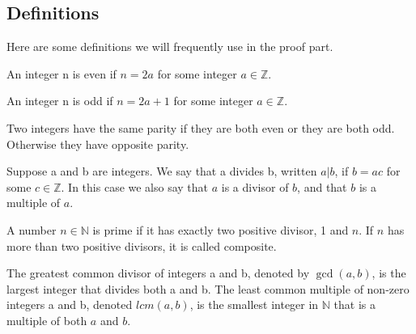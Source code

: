 \subsection{Definitions}
Here are some definitions we will frequently use in the proof part. 
\begin{definition}
    [Even]
    An integer n is even if $n = 2a$ for some integer $a \in \mathbb{Z}$.
\end{definition}
\begin{definition}
    [Odd]
    An integer n is odd if $n = 2a + 1$ for some integer $a \in \mathbb{Z}$.
\end{definition}
\begin{definition}
    Two integers have the same parity if they are both even or they are both odd. Otherwise they have opposite parity. 
\end{definition}
\begin{definition}
    Suppose a and b are integers. We say that a divides b, written $a | b$, if $b = ac$ for some $c \in \mathbb{Z}$.
    In this case we also say that $a$ is a divisor of $b$, and that $b$ is a multiple of $a$. 
\end{definition}
\begin{definition}
    A number $n \in \mathbb{N}$ is prime if it has exactly two positive divisor, 1 and $n$. If $n$ has more than two positive divisors, it is called composite. 
\end{definition}
\begin{definition}
    The greatest common divisor of integers a and b, denoted by $\gcd(a, b)$, is the largest integer that divides both a and b. 
    The least common multiple of non-zero integers a and b, denoted $lcm(a, b)$, is the smallest integer in $\mathbb{N}$ that is a multiple of both $a$ and $b$. 
\end{definition}

\newpage
